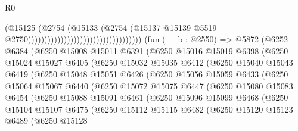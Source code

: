 \begin{lexlean}{R0}
\begin{coremodule}
                                                                (@15125
                                                                  (@2754
                                                                    (@15133
                                                                      (@2754
                                                                        (@15137
                                                                          @15139
                                                                          @5519
                                                                          @2750)))))))))))))))))))))))))))))))))))
    (fun (__b : @2550) =>
    @5872
      (@6252
        @6384
        (@6250
          @15008
          @15011
          @6391
          (@6250
            @15016
            @15019
            @6398
            (@6250
              @15024
              @15027
              @6405
              (@6250
                @15032
                @15035
                @6412
                (@6250
                  @15040
                  @15043
                  @6419
                  (@6250
                    @15048
                    @15051
                    @6426
                    (@6250
                      @15056
                      @15059
                      @6433
                      (@6250
                        @15064
                        @15067
                        @6440
                        (@6250
                          @15072
                          @15075
                          @6447
                          (@6250
                            @15080
                            @15083
                            @6454
                            (@6250
                              @15088
                              @15091
                              @6461
                              (@6250
                                @15096
                                @15099
                                @6468
                                (@6250
                                  @15104
                                  @15107
                                  @6475
                                  (@6250
                                    @15112
                                    @15115
                                    @6482
                                    (@6250
                                      @15120
                                      @15123
                                      @6489
                                      (@6250
                                        @15128

\end{coremodule}
\end{lexlean}
